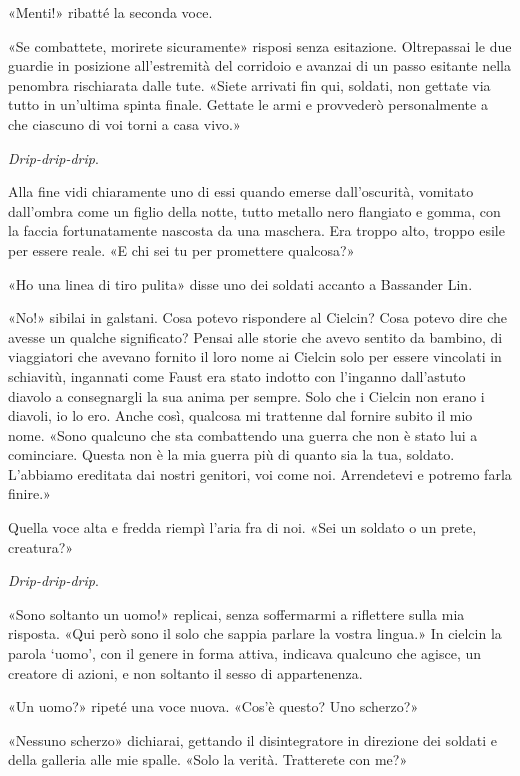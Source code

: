 «Menti!» ribatté la seconda voce.

«Se combattete, morirete sicuramente» risposi senza esitazione.
Oltrepassai le due guardie in posizione all'estremità del corridoio e
avanzai di un passo esitante nella penombra rischiarata dalle tute.
«Siete arrivati fin qui, soldati, non gettate via tutto in un'ultima
spinta finale. Gettate le armi e provvederò personalmente a che ciascuno
di voi torni a casa vivo.»

\emph{Drip-drip-drip}.

Alla fine vidi chiaramente uno di essi quando emerse dall'oscurità,
vomitato dall'ombra come un figlio della notte, tutto metallo nero
flangiato e gomma, con la faccia fortunatamente nascosta da una
maschera. Era troppo alto, troppo esile per essere reale. «E chi sei tu
per promettere qualcosa?»

«Ho una linea di tiro pulita» disse uno dei soldati accanto a Bassander
Lin.

«No!» sibilai in galstani. Cosa potevo rispondere al Cielcin? Cosa
potevo dire che avesse un qualche significato? Pensai alle storie che
avevo sentito da bambino, di viaggiatori che avevano fornito il loro
nome ai Cielcin solo per essere vincolati in schiavitù, ingannati come
Faust era stato indotto con l'inganno dall'astuto diavolo a consegnargli
la sua anima per sempre. Solo che i Cielcin non erano i diavoli, io lo
ero. Anche così, qualcosa mi trattenne dal fornire subito il mio nome.
«Sono qualcuno che sta combattendo una guerra che non è stato lui a
cominciare. Questa non è la mia guerra più di quanto sia la tua,
soldato. L'abbiamo ereditata dai nostri genitori, voi come noi.
Arrendetevi e potremo farla finire.»

Quella voce alta e fredda riempì l'aria fra di noi. «Sei un soldato o un
prete, creatura?»

\emph{Drip-drip-drip}.

«Sono soltanto un uomo!» replicai, senza soffermarmi a riflettere sulla
mia risposta. «Qui però sono il solo che sappia parlare la vostra
lingua.» In cielcin la parola `uomo', con il genere in forma attiva,
indicava qualcuno che agisce, un creatore di azioni, e non soltanto il
sesso di appartenenza.

«Un uomo?» ripeté una voce nuova. «Cos'è questo? Uno scherzo?»

«Nessuno scherzo» dichiarai, gettando il disintegratore in direzione dei
soldati e della galleria alle mie spalle. «Solo la verità. Tratterete
con me?»

